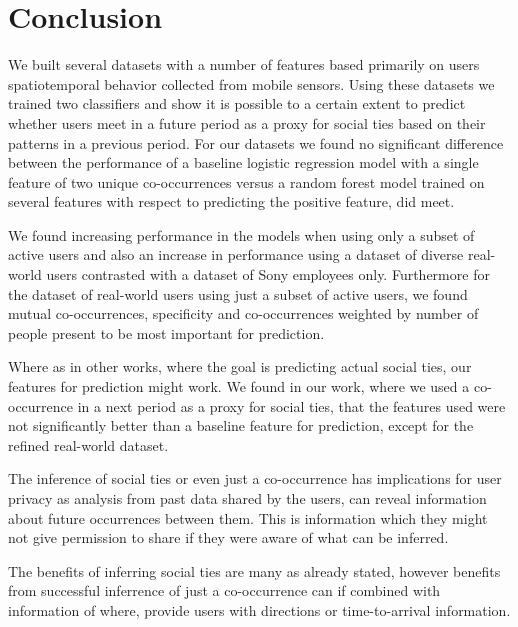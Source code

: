 \chapter{Conclusion}
\label{chap:conclusion}
We built several datasets with a number of features based primarily on users spatiotemporal behavior collected from mobile sensors. Using these datasets we trained two classifiers and show it is possible to a certain extent to predict whether users meet in a future period as a proxy for social ties based on their patterns in a previous period. For our datasets we found no significant difference between the performance of a baseline logistic regression model with a single feature of two unique co-occurrences versus a random forest model trained on several features with respect to predicting the positive feature, did meet.

We found increasing performance in the models when using only a subset of active users and also an increase in performance using a dataset of diverse real-world users contrasted with a dataset of Sony employees only. Furthermore for the dataset of real-world users using just a subset of active users, we found mutual co-occurrences, specificity and co-occurrences weighted by number of people present to be most important for prediction.

Where as in other works, where the goal is predicting actual social ties, our features for prediction might work. We found in our work, where we used a co-occurrence in a next period as a proxy for social ties, that the features used were not significantly better than a baseline feature for prediction, except for the refined real-world dataset.

The inference of social ties or even just a co-occurrence has implications for user privacy as analysis from past data shared by the users, can reveal information about future occurrences between them. This is information which they might not give permission to share if they were aware of what can be inferred.

The benefits of inferring social ties are many as already stated, however benefits from successful inferrence of just a co-occurrence can if combined with information of where, provide users with directions or time-to-arrival information.